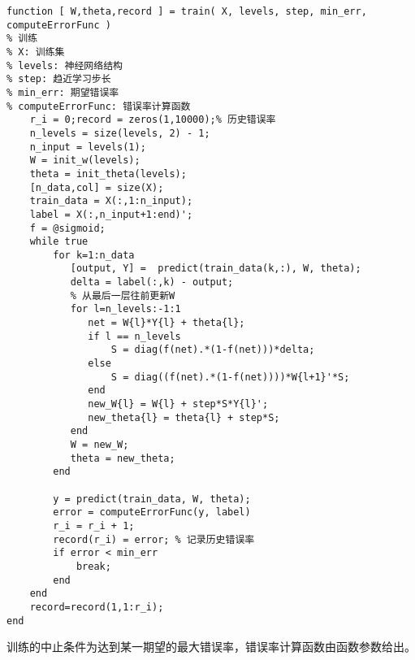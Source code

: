 \begin{lstlisting}
function [ W,theta,record ] = train( X, levels, step, min_err, computeErrorFunc )
% 训练
% X: 训练集
% levels: 神经网络结构
% step: 趋近学习步长
% min_err: 期望错误率
% computeErrorFunc: 错误率计算函数
    r_i = 0;record = zeros(1,10000);% 历史错误率
    n_levels = size(levels, 2) - 1;
    n_input = levels(1);
    W = init_w(levels);
    theta = init_theta(levels);
    [n_data,col] = size(X);
    train_data = X(:,1:n_input); 
    label = X(:,n_input+1:end)';
    f = @sigmoid;
    while true
        for k=1:n_data
           [output, Y] =  predict(train_data(k,:), W, theta);
           delta = label(:,k) - output;
           % 从最后一层往前更新W
           for l=n_levels:-1:1
              net = W{l}*Y{l} + theta{l};
              if l == n_levels
                  S = diag(f(net).*(1-f(net)))*delta;
              else
                  S = diag((f(net).*(1-f(net))))*W{l+1}'*S;
              end
              new_W{l} = W{l} + step*S*Y{l}';
              new_theta{l} = theta{l} + step*S;
           end 
           W = new_W;
           theta = new_theta;
        end 

        y = predict(train_data, W, theta);
        error = computeErrorFunc(y, label)
        r_i = r_i + 1;
        record(r_i) = error; % 记录历史错误率
        if error < min_err
            break;
        end
    end
    record=record(1,1:r_i);
end
\end{lstlisting}

训练的中止条件为达到某一期望的最大错误率，错误率计算函数由函数参数给出。